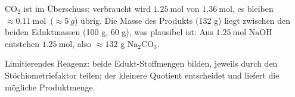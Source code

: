 \begin{kontrolle}
$\mathrm{CO_2}$ ist im Überschuss: verbraucht wird
$1.25\ \mathrm{mol}$ von $1.36\ \mathrm{mol}$, es bleiben $\approx
0.11\ \mathrm{mol}$ \,($\approx \qty{5}{g}$) übrig. Die Masse des Produkts
(132 g) liegt zwischen den beiden Eduktmassen (100 g, 60 g), was plausibel
ist: Aus $1.25\ \mathrm{mol}$ $\mathrm{NaOH}$ entstehen $1.25\ \mathrm{mol}$,
also $\approx 132$ g $\mathrm{Na_2CO_3}$.
\end{kontrolle}

\begin{merksatz}
Limitierendes Reagenz: beide Edukt-Stoffmengen bilden, jeweils durch den
Stöchiometriefaktor teilen; der kleinere Quotient entscheidet und liefert die
mögliche Produktmenge.
\end{merksatz}
